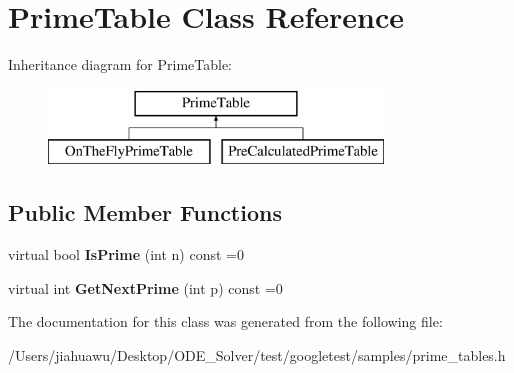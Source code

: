 \hypertarget{class_prime_table}{}\section{Prime\+Table Class Reference}
\label{class_prime_table}
Inheritance diagram for Prime\+Table\+:\begin{figure}[H]
\begin{center}
\leavevmode
\includegraphics[height=2.000000cm]{class_prime_table}
\end{center}
\end{figure}
\subsection*{Public Member Functions}
\begin{DoxyCompactItemize}
\item 
\mbox{\label{class_prime_table_a2ab9243364ded0c51541f641b2df362a}} 
virtual bool {\bfseries Is\+Prime} (int n) const =0
\item 
\mbox{\label{class_prime_table_ae537c939f56617d8937d57bbbae3ab30}} 
virtual int {\bfseries Get\+Next\+Prime} (int p) const =0
\end{DoxyCompactItemize}


The documentation for this class was generated from the following file\+:\begin{DoxyCompactItemize}
\item 
/\+Users/jiahuawu/\+Desktop/\+O\+D\+E\+\_\+\+Solver/test/googletest/samples/prime\+\_\+tables.\+h\end{DoxyCompactItemize}
